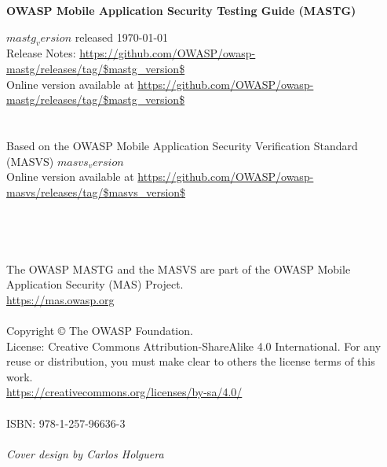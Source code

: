 \thispagestyle{empty} %

\textbf{OWASP Mobile Application Security Testing Guide (MASTG)}

$mastg_version$ released \today \\

Release Notes: \url{https://github.com/OWASP/owasp-mastg/releases/tag/$mastg_version$} \\

Online version available at \url{https://github.com/OWASP/owasp-mastg/releases/tag/$mastg_version$} \\ \\ \\


Based on the OWASP Mobile Application Security Verification Standard (MASVS) $masvs_version$ \\

Online version available at \url{https://github.com/OWASP/owasp-masvs/releases/tag/$masvs_version$} \\ \\ \\ \\ \\



The OWASP MASTG and the MASVS are part of the OWASP Mobile Application Security (MAS) Project. \\
\url{https://mas.owasp.org} \\ \\

Copyright © The OWASP Foundation. \\

License: Creative Commons Attribution-ShareAlike 4.0 International.
For any reuse or distribution, you must make clear to others the license terms of this work. \\
\url{https://creativecommons.org/licenses/by-sa/4.0/} \\ \\

ISBN: 978-1-257-96636-3 \\ \\


\emph{Cover design by Carlos Holguera}